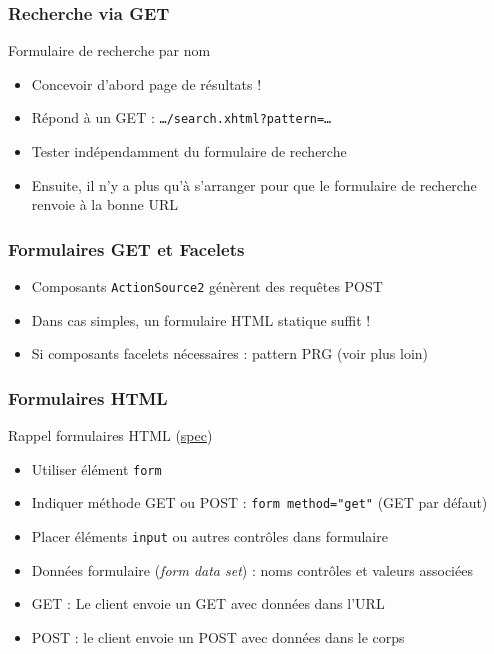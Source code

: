 \documentclass[english, french]{beamer}
\begin{document}
\begin{frame}
	\frametitle{Recherche via GET}
	\begin{exampleblock}{Formulaire de recherche par nom}
		\begin{itemize}
			\item Concevoir d’abord page de résultats !
			\item Répond à un GET : \texttt{…/search.xhtml?pattern=…}
			\item Tester indépendamment du formulaire de recherche
			\item Ensuite, il n’y a plus qu’à s’arranger pour que le formulaire de recherche renvoie à la bonne URL
		\end{itemize}
	\end{exampleblock}
\end{frame}

\begin{frame}
	\frametitle{Formulaires GET et Facelets}
	\begin{itemize}
		\item Composants \texttt{ActionSource2} génèrent des requêtes POST
		\item Dans cas simples, un formulaire HTML statique suffit !
		\item Si composants facelets nécessaires : pattern PRG (voir plus loin)
	\end{itemize}
\end{frame}

\begin{frame}
	\frametitle{Formulaires HTML}
	Rappel formulaires HTML (\href{https://www.w3.org/TR/html4/interact/forms.html}{spec})
	\begin{itemize}
		\item Utiliser élément \texttt{form}
		\item Indiquer méthode GET ou POST : \texttt{form method="get"} {\tiny (GET par défaut)}
		\item Placer éléments \texttt{input} {\tiny ou autres contrôles} dans formulaire
		\item Données formulaire (\emph{form data set}) : noms contrôles et valeurs associées
		\item GET : Le client envoie un GET avec données dans l’URL
		\item POST : le client envoie un POST avec données dans le corps
	\end{itemize}
\end{frame}
\end{document}

